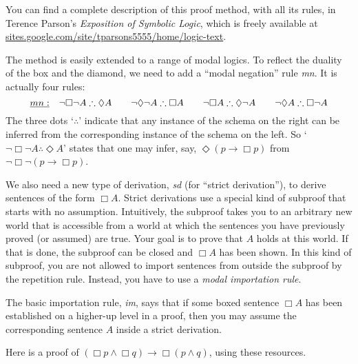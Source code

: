 \documentclass{../wobook2018}
\begin{document}
You can find a complete description of this proof method, with all its
rules, in Terence Parson's \emph{Exposition of Symbolic Logic}, which
is freely available at
\href{https://sites.google.com/site/tparsons5555/home/logic-text}{sites.google.com/site/tparsons5555/home/logic-text}.

The method is easily extended to a range of modal logics. To reflect
the duality of the box and the diamond, we need to add a ``modal
negation'' rule \emph{mn}. It is actually four rules:
%
\[ 
  \emph{mn:}\quad
  \neg \Box \neg A \therefore \Diamond A \qquad
  \neg \Diamond \neg A \therefore \Box A \qquad
  \neg \Box A \therefore \Diamond\neg A \qquad
  \neg \Diamond A \therefore \Box \neg A
\]
The three dots `$\therefore$' indicate that any instance of the schema
on the right can be inferred from the corresponding instance of the
schema on the left. So `$\neg \Box \neg A \therefore \Diamond A$'
states that one may infer, say, $\Diamond (p \to \Box p)$ from
$\neg \Box \neg (p \to \Box p)$.

We also need a new type of derivation, \emph{sd} (for ``strict
derivation''), to derive sentences of the form $\Box A$. Strict
derivations use a special kind of subproof that starts with no
assumption. Intuitively, the subproof takes you to an arbitrary new
world that is accessible from a world at which the sentences you have
previously proved (or assumed) are true. Your goal is to prove that
$A$ holds at this world. If that is done, the subproof can be closed
and $\Box A$ has been shown. In this kind of subproof, you are not
allowed to import sentences from outside the subproof by the
repetition rule. Instead, you have to use a \emph{modal importation
  rule}.

The basic importation rule, \emph{im}, says that if some boxed
sentence $\Box A$ has been established on a higher-up level in a
proof, then you may assume the corresponding sentence $A$ inside a
strict derivation.

Here is a proof of $(\Box p \land \Box q) \to \Box (p\land q)$, using
these resources.
 
\begin{KMcalc}[]
  \KMclose[]
  \KMclose[]
\end{KMcalc}
\end{document}
